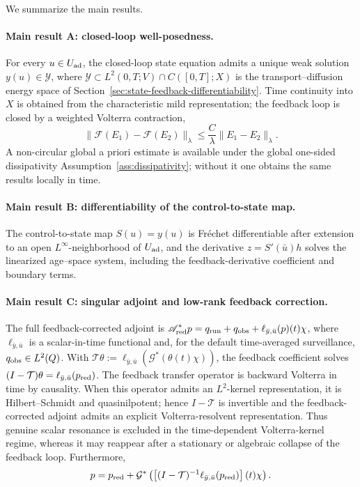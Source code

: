 \documentclass[pdflatex,sn-mathphys-num]{sn-jnl}
\theoremstyle{plain}
\theoremstyle{definition}
\theoremstyle{remark}
\begin{document}
We summarize the main results.

\paragraph{Main result A: closed-loop well-posedness.}
For every $u\in U_{\rm ad}$, the closed-loop state equation admits a unique
weak solution $y(u)\in\mathcal Y$, where
$\mathcal Y\subset L^2(0,T;V)\cap C([0,T];X)$ is the transport--diffusion
energy space of Section~\ref{sec:state-feedback-differentiability}. Time
continuity into $X$ is obtained from the characteristic mild representation;
the feedback loop is closed by a weighted Volterra contraction,
\[
\|\mathcal F(E_1)-\mathcal F(E_2)\|_\lambda
\le
\frac{C}{\lambda}
\|E_1-E_2\|_\lambda .
\]
A non-circular global a priori estimate is available under the global
one-sided dissipativity Assumption~\ref{ass:dissipativity}; without it one
obtains the same results locally in time.

\paragraph{Main result B: differentiability of the control-to-state map.}
The control-to-state map $S(u)=y(u)$ is Fr\'echet differentiable after
extension to an open $L^\infty$-neighborhood of $U_{\rm ad}$, and the
derivative $z=S'(\bar u)h$ solves the linearized age--space system, including
the feedback-derivative coefficient and boundary terms.

\paragraph{Main result C: singular adjoint and low-rank feedback correction.}
The full feedback-corrected adjoint is
$\displaystyle \mathscr A_{\rm red}^*p
=
q_{\rm run}+q_{\rm obs}
+
\ell_{\bar y,\bar u}(p)(t)\chi $,
where $\ell_{\bar y,\bar u}$ is a scalar-in-time functional and, for the
default time-averaged surveillance, $q_{\rm obs}\in L^2(Q)$. With
$\mathcal T\theta:=\ell_{\bar y,\bar u}(\mathcal G^*(\theta(t)\chi))$, the
feedback coefficient solves $(I-\mathcal T)\theta=\ell_{\bar y,\bar u}(p_{\rm
red})$. 
The feedback transfer operator is backward Volterra in time by causality.
When this operator admits an \(L^2\)-kernel representation, it is
Hilbert--Schmidt and quasinilpotent; hence \(I-\mathcal T\) is invertible and
the feedback-corrected adjoint admits an explicit Volterra-resolvent
representation. Thus genuine scalar resonance is excluded in the
time-dependent Volterra-kernel regime, whereas it may reappear after a
stationary or algebraic collapse of the feedback loop.
Furthermore,
\[
p
=
p_{\rm red}
+
\mathcal G^*
\left(
\left[
(I-\mathcal T)^{-1}
\ell_{\bar y,\bar u}(p_{\rm red})
\right](t)\chi
\right).
\]
\end{document}

